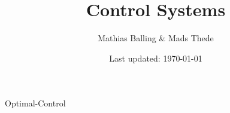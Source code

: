 \documentclass{article}
\title{Control Systems}
\author{Mathias Balling \& Mads Thede}
\date{Last updated: \today}
\begin{document}
\maketitle
\tableofcontents











 {Optimal-Control}
\end{document}
